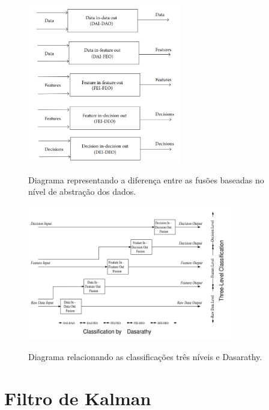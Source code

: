 \documentclass[acronym, symbols]{fei}
\begin{document}
				\begin{figure}[!htb]
					\centering
					\caption{Diagrama representando a diferença entre as fusões baseadas no nível de abstração dos dados.} 
					\includegraphics[width=0.6\textwidth]{classificacao_2_fusao_de_sensores.png}
					\label{fig:classificacao_2_fusao_de_sensores}
				\end{figure}
			
				\begin{figure}[!htb]
					\centering
					\caption{Diagrama relacionando as classificações três níveis e Dasarathy.} 
					\includegraphics[width=0.8\textwidth]{classificacao_3_fusao_de_sensores.png}
					\label{fig:classificacao_3_fusao_de_sensores}
				\end{figure}
	
	\section{Filtro de Kalman}
		
\end{document}
